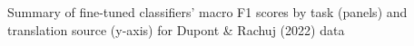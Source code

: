 Summary of fine-tuned classifiers' macro F1 scores by task (panels) and translation source (y-axis) for Dupont \& Rachuj (2022) data \label{fig:f1_scores_dupont_and_rachuj_2022}
